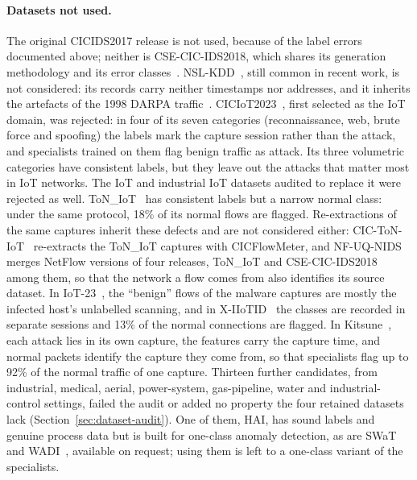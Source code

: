 \paragraph{Datasets not used.}
The original CICIDS2017 release is not used, because of the label errors documented
above; neither is CSE-CIC-IDS2018, which shares its generation methodology and its error
classes~\cite{liu2022error}. NSL-KDD~\cite{tavallaee2009nslkdd}, still common in recent
work, is not considered: its records carry neither timestamps nor addresses, and it
inherits the artefacts of the 1998 DARPA traffic~\cite{mchugh2000darpa}.
CICIoT2023~\cite{neto2023ciciot2023}, first selected as the IoT domain, was rejected: in
four of its seven categories (reconnaissance, web, brute force and spoofing) the labels
mark the capture session rather than the attack, and specialists trained on them flag
benign traffic as attack. Its three volumetric categories have consistent labels, but
they leave out the attacks that matter most in IoT networks. The IoT and industrial IoT
datasets audited to replace it were rejected as well.
ToN\_IoT~\cite{moustafa2021toniot} has consistent labels but a narrow normal class: under
the same protocol, 18\% of its normal flows are flagged. Re-extractions of the same
captures inherit these defects and are not considered either:
CIC-ToN-IoT~\cite{cic2021toniot} re-extracts the ToN\_IoT captures with CICFlowMeter, and
NF-UQ-NIDS~\cite{sarhan2021netflow} merges NetFlow versions of four releases, ToN\_IoT and
CSE-CIC-IDS2018 among them, so that the network a flow comes from also identifies its
source dataset. In IoT-23~\cite{garcia2020iot23}, the ``benign'' flows of the malware
captures are mostly the infected host's unlabelled scanning, and in
X-IIoTID~\cite{alhawawreh2022xiiotid} the classes are recorded in separate sessions and
13\% of the normal connections are flagged. In Kitsune~\cite{mirsky2018kitsune}, each
attack lies in its own capture, the features carry the capture time, and normal packets
identify the capture they come from, so that specialists flag up to 92\% of the normal
traffic of one capture. Thirteen further candidates, from industrial,
medical, aerial, power-system, gas-pipeline, water and industrial-control settings, failed
the audit or added no property the four retained datasets lack
(Section~\ref{sec:dataset-audit}). One of them, HAI, has sound labels and genuine process
data but is built for one-class anomaly detection, as are SWaT and
WADI~\cite{mathur2016swat,ahmed2017wadi}, available on request; using them is left to a
one-class variant of the specialists.

